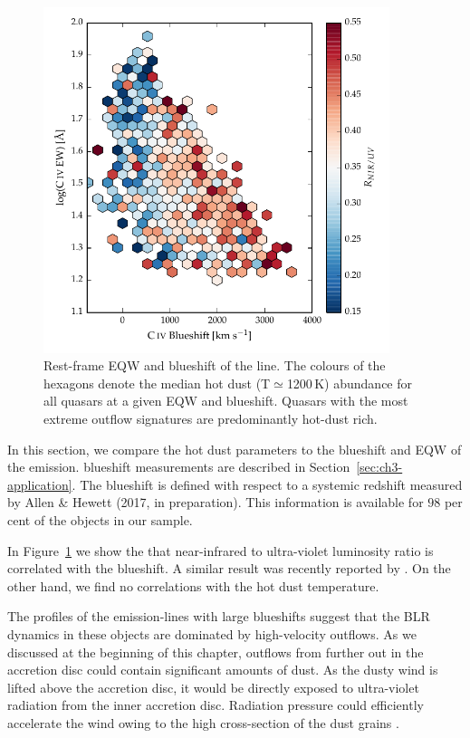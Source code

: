 \begin{figure}[t!]
\centering
  \includegraphics[width=0.9\textwidth]{figures/chapter05/hot_dust_ratio.pdf}
\caption[{Hot dust abundance as a function of rest-frame EQW and blueshift of the  line.}]{Rest-frame EQW and blueshift of the  line. The colours of the hexagons denote the median hot dust (T$\simeq$1200\,K) abundance for all quasars at a given EQW and blueshift. Quasars with the most extreme outflow signatures are predominantly hot-dust rich.}
  \label{fig:civ_hot_dust}
\end{figure}

In this section, we compare the hot dust parameters to the blueshift and EQW of the  emission. 
 blueshift measurements are described in Section~\ref{sec:ch3-application}. 
The  blueshift is defined with respect to a systemic redshift measured by Allen \& Hewett (2017, in preparation). 
This information is available for $98$ per cent of the objects in our sample. 

In Figure~\ref{fig:civ_hot_dust} we show the that near-infrared to ultra-violet luminosity ratio is correlated with the  blueshift. 
A similar result was recently reported by \citet{wang13}. 
On the other hand, we find no correlations with the hot dust temperature. 

The profiles of the emission-lines with large  blueshifts suggest that the BLR dynamics in these objects are dominated by high-velocity outflows. 
As we discussed at the beginning of this chapter, outflows from further out in the accretion disc could contain significant amounts of dust. 
As the dusty wind is lifted above the accretion disc, it would be directly exposed to ultra-violet radiation from the inner accretion disc. 
Radiation pressure could efficiently accelerate the wind owing to the high cross-section of the dust grains \citep[e.g.][]{fabian12}.  

